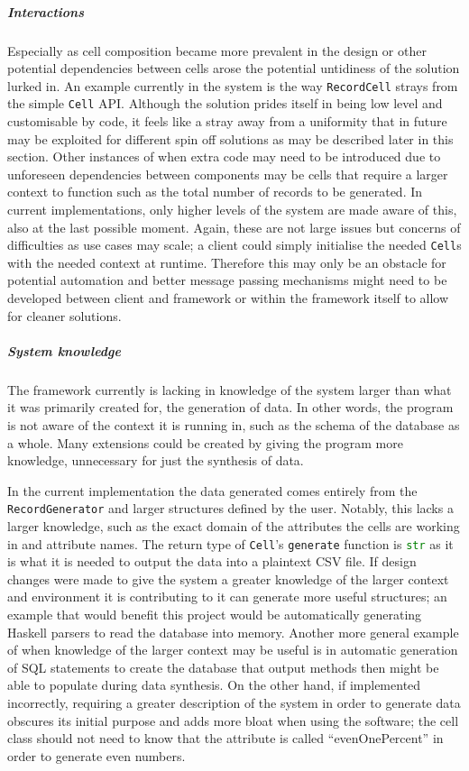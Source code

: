 \subparagraph{Interactions} Especially as cell composition became more prevalent
in the design or other potential dependencies between cells arose the potential
untidiness of the solution lurked in. An example currently in the system is the
way \lstinline{RecordCell} strays from the simple \lstinline{Cell} API. Although
the solution prides itself in being low level and customisable by code, it
feels like a stray away from a uniformity that in future may be exploited for
different spin off solutions as may be described later in this section. Other
instances of when extra code may need to be introduced due to unforeseen
dependencies between components may be cells that require a larger context to
function such as
the total number of records to be generated. In current implementations, only
higher levels of the system are made aware of this, also at the last possible
moment. Again, these are not large issues but concerns of difficulties as
use cases may scale; a client could simply initialise the needed
\lstinline{Cell}s with the needed context at runtime. Therefore this may only
be an obstacle for potential automation and better message passing mechanisms
might need to be developed between client and framework or within the framework
itself to allow for cleaner solutions.

\subparagraph{System knowledge} The framework currently is lacking in knowledge
of the system larger than what it was primarily created for, the generation of
data. In other words, the program is not aware of the context it is running in,
such as the schema of the database as a whole. Many extensions could be created
by giving the program more knowledge, unnecessary for just the synthesis of
data.

In the current implementation the data generated comes entirely from the
\lstinline{RecordGenerator} and larger structures defined by the user. Notably,
this lacks a larger knowledge, such as the exact domain of the attributes the
cells are working in and attribute names. The return type of \lstinline{Cell}'s
\lstinline{generate} function is \lstinline[language=Python]{str} as it is what
it is needed to output the data into a plaintext CSV file. If design changes
were made to give the system a greater knowledge of the larger context and
environment it is contributing to it can generate more useful structures; an
example that would benefit this project would be automatically generating
Haskell parsers to read the database into memory. Another more general example of when
knowledge of the larger context may be useful is in automatic generation of SQL
statements to create the database that output methods then might be able to
populate during data synthesis. On the other hand, if implemented incorrectly,
requiring a greater description of the system in order to generate data obscures
its initial purpose and adds more bloat when using the software; the cell class
should not need to know that the attribute is called ``evenOnePercent'' in order
to generate even numbers.

